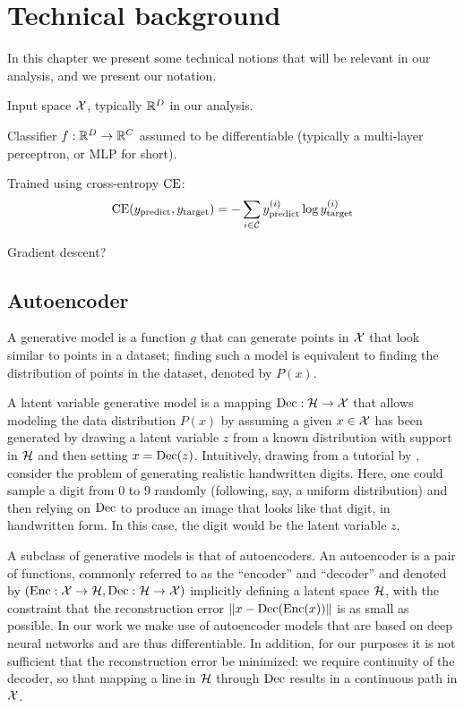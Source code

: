 \documentclass[../main.tex]{subfiles}
\begin{document}
\chapter{Technical background}
\label{ch:background}

In this chapter we present some technical notions that will be relevant in our analysis, and we present our notation.

Input space $\mathcal{X}$, typically $\mathbb{R}^D$ in our analysis.

Classifier $f: \mathbb{R}^D \to \mathbb{R}^C$ assumed to be differentiable (typically a multi-layer perceptron, or MLP for short).

Trained using cross-entropy $\text{CE}$:
\begin{equation}
    \text{CE}(y_\text{predict}, y_{\mathrm{target}}) = - \sum_{i \in \mathcal{C}} y_\text{predict}^{(i)} \log y_{\mathrm{target}}^{(i)}
\end{equation}

Gradient descent?


\section{Autoencoder}

A generative model is a function $g$ that can generate points in $\mathcal{X}$ that look similar to points in a dataset; finding such a model is equivalent to finding the distribution of points in the dataset, denoted by $P(x)$.

A latent variable generative model is a mapping $\operatorname{Dec}: \mathcal{H} \to \mathcal{X}$ that allows modeling the data distribution $P(x)$ by assuming a given $x \in \mathcal{X}$ has been generated by drawing a latent variable $z$ from a known distribution with support in $\mathcal{H}$ and then setting $x = \operatorname{Dec}(z)$.
Intuitively, drawing from a tutorial by \citeauthor{doerschTutorial2021} \cite{doerschTutorial2021}, consider the problem of generating realistic handwritten digits.
Here, one could sample a digit from 0 to 9 randomly (following, say, a uniform distribution) and then relying on $\operatorname{Dec}$ to produce an image that looks like that digit, in handwritten form. In this case, the digit would be the latent variable $z$.

A subclass of generative models is that of autoencoders.
An autoencoder is a pair of functions, commonly referred to as the ``encoder'' and ``decoder'' and denoted by $(\operatorname{Enc}: \mathcal{X} \to \mathcal{H}, \operatorname{Dec}: \mathcal{H} \to \mathcal{X})$ implicitly defining a latent space $\mathcal{H}$, with the constraint that the reconstruction error $\left\lVert x - \operatorname{Dec}(\operatorname{Enc}(x))\right\rVert$ is as small as possible.
In our work we make use of autoencoder models that are based on deep neural networks and are thus differentiable.
In addition, for our purposes it is not sufficient that the reconstruction error be minimized: we require continuity of the decoder, so that mapping a line in $\mathcal{H}$ through $\operatorname{Dec}$ results in a continuous path in $\mathcal{X}$.
\end{document}
